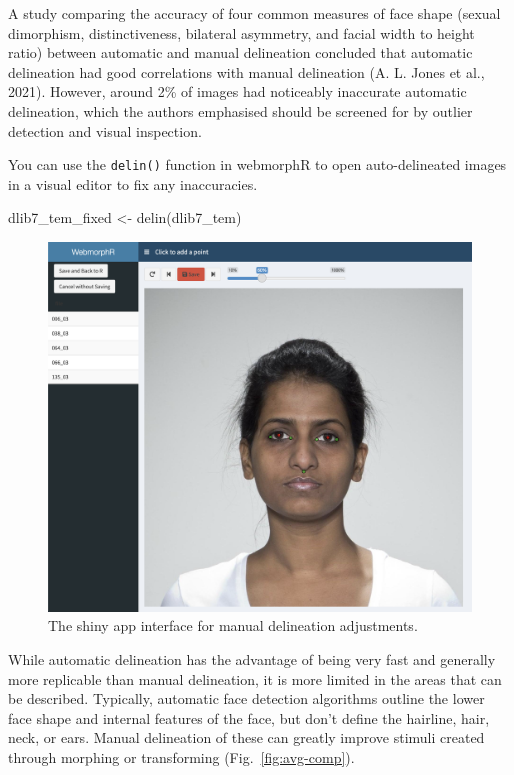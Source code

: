 \documentclass[
  doc,floatsintext]{apa6}
\newenvironment{Shaded}{\begin{snugshade}}{\end{snugshade}}
\newcommand{\FunctionTok}[1]{\textcolor[rgb]{0.00,0.00,0.00}{#1}}
\newcommand{\NormalTok}[1]{#1}
\newcommand{\OtherTok}[1]{\textcolor[rgb]{0.56,0.35,0.01}{#1}}
\begin{document}
A study comparing the accuracy of four common measures of face shape (sexual dimorphism, distinctiveness, bilateral asymmetry, and facial width to height ratio) between automatic and manual delineation concluded that automatic delineation had good correlations with manual delineation (A. L. Jones et al., 2021). However, around 2\% of images had noticeably inaccurate automatic delineation, which the authors emphasised should be screened for by outlier detection and visual inspection.

You can use the \texttt{delin()} function in webmorphR to open auto-delineated images in a visual editor to fix any inaccuracies.

\begin{Shaded}
\begin{Highlighting}[]
\NormalTok{dlib7\_tem\_fixed }\OtherTok{\textless{}{-}} \FunctionTok{delin}\NormalTok{(dlib7\_tem)}
\end{Highlighting}
\end{Shaded}

\begin{figure}
\includegraphics[width=1\linewidth]{images/delin} \caption{The shiny app interface for manual delineation adjustments.}\label{fig:delin-shiny}
\end{figure}

While automatic delineation has the advantage of being very fast and generally more replicable than manual delineation, it is more limited in the areas that can be described. Typically, automatic face detection algorithms outline the lower face shape and internal features of the face, but don't define the hairline, hair, neck, or ears. Manual delineation of these can greatly improve stimuli created through morphing or transforming (Fig.~\ref{fig:avg-comp}).
\end{document}
